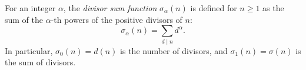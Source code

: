 For an integer $\alpha$, the \textit{divisor sum function} $\sigma_{\alpha}(n)$ is defined for $n \geq 1$ as the sum of the $\alpha$-th powers of the positive divisors of $n$:
$$\sigma_{\alpha}(n) = \sum_{d \mid n} d^{\alpha}.$$
In particular, $\sigma_0(n) = d(n)$ is the number of divisors, and $\sigma_1(n) = \sigma(n)$ is the sum of divisors.
